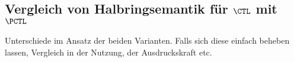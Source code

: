 
\subsection{Vergleich von Halbringsemantik für $\CTL$ mit $\PCTL$}

Unterschiede im Ansatz der beiden Varianten. Falls sich diese einfach beheben lassen, Vergleich in der Nutzung, der Ausdruckskraft etc.